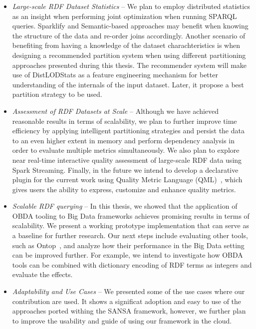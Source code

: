 \begin{itemize}
    \item \textit{Large-scale RDF Dataset Statistics} -- 
    We plan to employ distributed statistics as an insight when performing joint optimization when running SPARQL queries. 
    Sparklify and Semantic-based approaches may benefit when knowing the structure of the data and re-order joins accordingly.
    Another scenario of benefiting from having a knowledge of the dataset charachteristics is when designing a recommended partition system when using different partitioning approaches presented during this thesis.
    The recommender system will make use of DistLODStats as a feature engineering mechanism for better understanding of the internals of the input dataset. 
    Later, it propose a best partition strategy to be used.
    \item \textit{Assessment of RDF Datasets at Scale} -- 
    Although we have achieved reasonable results in terms of scalability, we plan to further improve time efficiency by applying intelligent partitioning strategies and persist the data to an even higher extent in memory and perform dependency analysis in order to evaluate multiple metrics simultaneously. 
    We also plan to explore near real-time interactive quality assessment of large-scale RDF data using Spark Streaming.
    Finally, in the future we intend to develop a declarative plugin for the current work using Quality Metric Language (QML)~\cite{debattista2016luzzu}, which gives users the ability to express, customize and enhance quality metrics.
    \item \textit{Scalable RDF querying} -- 
    In this thesis, we showed that the application of OBDA tooling to Big Data frameworks achieves promising results in terms of scalability. 
    We present a working prototype implementation that can serve as a baseline for further research. 
    Our next steps include evaluating other tools, such as Ontop~\cite{Calvanese2017OntopAS}, and analyze how their performance in the Big Data setting can be improved further. 
    For example, we intend to investigate how OBDA tools can be combined with dictionary encoding of RDF terms as integers and evaluate the effects.
    \item \textit{Adaptability and Use Cases} -- 
    We presented some of the use cases where our contribution are used. 
    It shows a significat adoption and easy to use of the approaches ported withing the SANSA framework, however, we further plan to improve the usability and guide of using our framework in the cloud.
\end{itemize}

